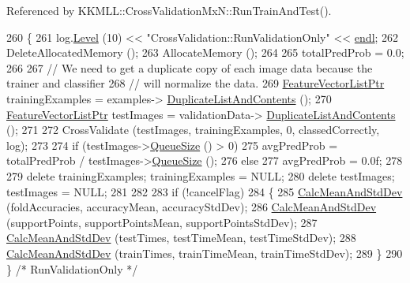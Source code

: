 Referenced by K\+K\+M\+L\+L\+::\+Cross\+Validation\+Mx\+N\+::\+Run\+Train\+And\+Test().


\begin{DoxyCode}
260 \{
261   log.\hyperlink{class_k_k_b_1_1_run_log_a32cf761d7f2e747465fd80533fdbb659}{Level} (10) << \textcolor{stringliteral}{"CrossValidation::RunValidationOnly"} << \hyperlink{namespace_k_k_b_ad1f50f65af6adc8fa9e6f62d007818a8}{endl};
262   DeleteAllocatedMemory ();
263   AllocateMemory ();
264 
265   totalPredProb = 0.0;
266 
267   \textcolor{comment}{// We need to get a duplicate copy of each image data because the trainer and classifier}
268   \textcolor{comment}{// will normalize the data.}
269   \hyperlink{class_k_k_m_l_l_1_1_feature_vector_list}{FeatureVectorListPtr}  trainingExamples = examples->
      \hyperlink{class_k_k_m_l_l_1_1_feature_vector_list_af14ad0946bbc6de8abdc4b513b6cf859}{DuplicateListAndContents} ();
270   \hyperlink{class_k_k_m_l_l_1_1_feature_vector_list}{FeatureVectorListPtr}  testImages       = validationData->
      \hyperlink{class_k_k_m_l_l_1_1_feature_vector_list_af14ad0946bbc6de8abdc4b513b6cf859}{DuplicateListAndContents} ();
271 
272   CrossValidate (testImages, trainingExamples, 0, classedCorrectly, log);
273 
274   \textcolor{keywordflow}{if}  (testImages->\hyperlink{class_k_k_b_1_1_k_k_queue_a1dab601f75ee6a65d97f02bddf71c40d}{QueueSize} () > 0)
275     avgPredProb = totalPredProb / testImages->\hyperlink{class_k_k_b_1_1_k_k_queue_a1dab601f75ee6a65d97f02bddf71c40d}{QueueSize} ();
276   \textcolor{keywordflow}{else}
277     avgPredProb = 0.0f;
278 
279   \textcolor{keyword}{delete}  trainingExamples;  trainingExamples = NULL;
280   \textcolor{keyword}{delete}  testImages;      testImages     = NULL;
281 
282 
283   \textcolor{keywordflow}{if}  (!cancelFlag)
284   \{
285     \hyperlink{namespace_k_k_b_ae94c8e8f87b5d40ee3eeeb06cf4cf15c}{CalcMeanAndStdDev} (foldAccuracies,  accuracyMean,       accuracyStdDev);
286     \hyperlink{namespace_k_k_b_ae94c8e8f87b5d40ee3eeeb06cf4cf15c}{CalcMeanAndStdDev} (supportPoints,   supportPointsMean,  supportPointsStdDev);
287     \hyperlink{namespace_k_k_b_ae94c8e8f87b5d40ee3eeeb06cf4cf15c}{CalcMeanAndStdDev} (testTimes,       testTimeMean,       testTimeStdDev);
288     \hyperlink{namespace_k_k_b_ae94c8e8f87b5d40ee3eeeb06cf4cf15c}{CalcMeanAndStdDev} (trainTimes,      trainTimeMean,      trainTimeStdDev);
289   \}
290 \}  \textcolor{comment}{/* RunValidationOnly */}
\end{DoxyCode}

